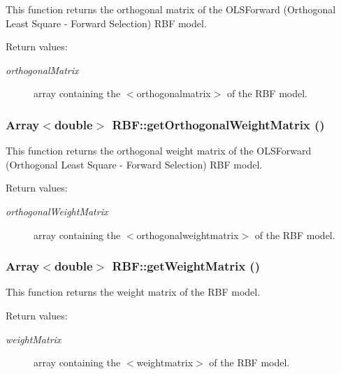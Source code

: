 This function returns the orthogonal matrix of the OLSForward (Orthogonal Least Square - Forward Selection) RBF model. 

\begin{Desc}
\item[Return values:]
\begin{description}
\item[{\em orthogonal\-Matrix}]array containing the $<$orthogonalmatrix$>$ of the RBF model.\end{description}
\end{Desc}
\subsubsection{\setlength{\rightskip}{0pt plus 5cm}Array$<$double$>$ RBF::get\-Orthogonal\-Weight\-Matrix ()}\label{classRBF_a20}


This function returns the orthogonal weight matrix of the OLSForward (Orthogonal Least Square - Forward Selection) RBF model. 

\begin{Desc}
\item[Return values:]
\begin{description}
\item[{\em orthogonal\-Weight\-Matrix}]array containing the $<$orthogonalweightmatrix$>$ of the RBF model.\end{description}
\end{Desc}
\subsubsection{\setlength{\rightskip}{0pt plus 5cm}Array$<$double$>$ RBF::get\-Weight\-Matrix ()}\label{classRBF_a18}


This function returns the weight matrix of the RBF model. 

\begin{Desc}
\item[Return values:]
\begin{description}
\item[{\em weight\-Matrix}]array containing the $<$weightmatrix$>$ of the RBF model.\end{description}
\end{Desc}
